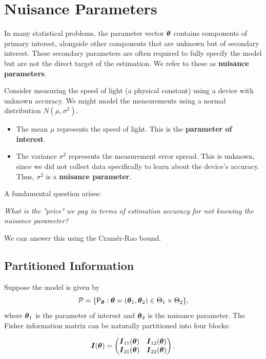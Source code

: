 \section{Nuisance Parameters}
\label{sec:nuisance-parameters}

In many statistical problems, the parameter vector $\boldsymbol{\theta}$ contains components of primary interest, alongside other components that are unknown but of secondary interest. These secondary parameters are often required to fully specify the model but are not the direct target of the estimation. We refer to these as \textbf{nuisance parameters}.

\begin{ex}
    Consider measuring the speed of light (a physical constant) using a device with unknown accuracy. We might model the measurements using a normal distribution $N(\mu, \sigma^2)$. 
    \begin{itemize}
        \item The mean $\mu$ represents the speed of light. This is the \textbf{parameter of interest}.
        \item The variance $\sigma^2$ represents the measurement error spread. This is unknown, since we did not collect data specifically to learn about the device's accuracy. Thus, $\sigma^2$ is a \textbf{nuisance parameter}.
    \end{itemize}
\end{ex}

A fundamental question arises: 

\textit{What is the "price" we pay in terms of estimation accuracy for not knowing the nuisance parameter?} 

We can answer this using the Cram\'er-Rao bound.

\subsection{Partitioned Information}

Suppose the model is given by
\[
\mathcal{P} = \{ \mathsf{P}_{\boldsymbol{\theta}} : \boldsymbol{\theta} = (\boldsymbol{\theta}_1, \boldsymbol{\theta}_2) \in \Theta_1 \times \Theta_2 \},
\]
where $\boldsymbol{\theta}_1$ is the parameter of interest and $\boldsymbol{\theta}_2$ is the nuisance parameter. The Fisher information matrix can be naturally partitioned into four blocks:

\[
\boldsymbol{I}(\boldsymbol{\theta}) = \begin{pmatrix} \boldsymbol{I}_{11}(\boldsymbol{\theta}) & \boldsymbol{I}_{12}(\boldsymbol{\theta}) \\ \boldsymbol{I}_{21}(\boldsymbol{\theta}) & \boldsymbol{I}_{22}(\boldsymbol{\theta}) \end{pmatrix}.
\]


